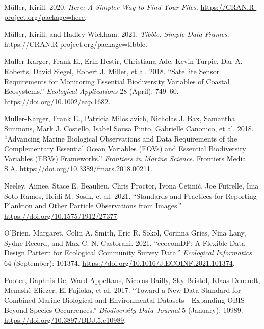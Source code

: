 \documentclass[
]{book}
\newlength{\cslhangindent}
\newlength{\cslentryspacingunit} %
\newenvironment{CSLReferences}[2] %
 {%
  \setlength{\parindent}{0pt}
  \ifodd #1
  \let\oldpar\par
  \def\par{\hangindent=\cslhangindent\oldpar}
  \fi
  \setlength{\parskip}{#2\cslentryspacingunit}
 }%
 {}
\begin{document}
\begin{CSLReferences}{1}{0}
\leavevmode{}%
Müller, Kirill. 2020. \emph{Here: A Simpler Way to Find Your Files}. \url{https://CRAN.R-project.org/package=here}.

\leavevmode{}%
Müller, Kirill, and Hadley Wickham. 2021. \emph{Tibble: Simple Data Frames}. \url{https://CRAN.R-project.org/package=tibble}.

\leavevmode{}%
Muller-Karger, Frank E., Erin Hestir, Christiana Ade, Kevin Turpie, Dar A. Roberts, David Siegel, Robert J. Miller, et al. 2018. {``Satellite Sensor Requirements for Monitoring Essential Biodiversity Variables of Coastal Ecosystems.''} \emph{Ecological Applications} 28 (April): 749--60. \url{https://doi.org/10.1002/eap.1682}.

\leavevmode{}%
Muller-Karger, Frank E., Patricia Miloslavich, Nicholas J. Bax, Samantha Simmons, Mark J. Costello, Isabel Sousa Pinto, Gabrielle Canonico, et al. 2018. {``Advancing Marine Biological Observations and Data Requirements of the Complementary Essential Ocean Variables (EOVs) and Essential Biodiversity Variables (EBVs) Frameworks.''} \emph{Frontiers in Marine Science}. Frontiers Media S.A. \url{https://doi.org/10.3389/fmars.2018.00211}.

\leavevmode{}%
Neeley, Aimee, Stace E. Beaulieu, Chris Proctor, Ivona Cetinić, Joe Futrelle, Inia Soto Ramos, Heidi M. Sosik, et al. 2021. {``Standards and Practices for Reporting Plankton and Other Particle Observations from Images.''} \url{https://doi.org/10.1575/1912/27377}.

\leavevmode{}%
O'Brien, Margaret, Colin A. Smith, Eric R. Sokol, Corinna Gries, Nina Lany, Sydne Record, and Max C. N. Castorani. 2021. {``ecocomDP: A Flexible Data Design Pattern for Ecological Community Survey Data.''} \emph{Ecological Informatics} 64 (September): 101374. \url{https://doi.org/10.1016/J.ECOINF.2021.101374}.

\leavevmode{}%
Pooter, Daphnis De, Ward Appeltans, Nicolas Bailly, Sky Bristol, Klaas Deneudt, Menashè Eliezer, Ei Fujioka, et al. 2017. {``Toward a New Data Standard for Combined Marine Biological and Environmental Datasets - Expanding OBIS Beyond Species Occurrences.''} \emph{Biodiversity Data Journal} 5 (January): 10989. \url{https://doi.org/10.3897/BDJ.5.e10989}.


\end{CSLReferences}
\end{document}
